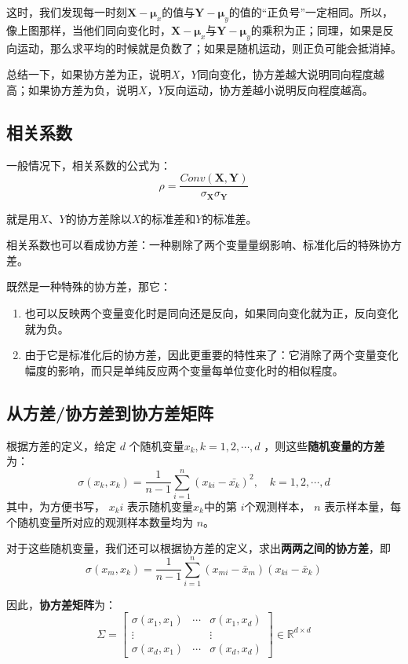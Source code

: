\documentclass[12pt]{article}
\begin{document}
这时，我们发现每一时刻$\mathbf{X} - \mathbf{\mu}_x$的值与$\mathbf{Y} - \mathbf{\mu}_y$的值的“正负号”一定相同。所以，像上图那样，当他们同向变化时，$\mathbf{X} - \mathbf{\mu}_x$与$\mathbf{Y} - \mathbf{\mu}_y$的乘积为正；同理，如果是反向运动，那么求平均的时候就是负数了；如果是随机运动，则正负可能会抵消掉。

总结一下，如果协方差为正，说明$X$，$Y$同向变化，协方差越大说明同向程度越高；如果协方差为负，说明$X$，$Y$反向运动，协方差越小说明反向程度越高。

\subsection{相关系数}
一般情况下，相关系数的公式为：
$$
\rho = \frac{Conv(\mathbf{X},\mathbf{Y})}{\sigma_{\mathbf{X}}\sigma_{\mathbf{Y}}}
$$

就是用$X$、$Y$的协方差除以$X$的标准差和$Y$的标准差。

相关系数也可以看成协方差：一种剔除了两个变量量纲影响、标准化后的特殊协方差。

既然是一种特殊的协方差，那它：
\begin{enumerate}
    \item 也可以反映两个变量变化时是同向还是反向，如果同向变化就为正，反向变化就为负。
    \item 由于它是标准化后的协方差，因此更重要的特性来了：它消除了两个变量变化幅度的影响，而只是单纯反应两个变量每单位变化时的相似程度。
\end{enumerate}

\subsection{从方差/协方差到协方差矩阵}
根据方差的定义，给定 $d$ 个随机变量$x_k, k = 1, 2, \cdots, d$ ，则这些\textbf{随机变量的方差}为：
$$
\sigma(x_k, x_k) = \frac{1}{n-1}\sum_{i=1}^n(x_{ki} - \bar{x_k})^2, \quad k = 1, 2, \cdots, d
$$
其中，为方便书写， $x_ki$ 表示随机变量$x_k$中的第 $i$个观测样本， $n$ 表示样本量，每个随机变量所对应的观测样本数量均为 $n$。

对于这些随机变量，我们还可以根据协方差的定义，求出\textbf{两两之间的协方差}，即
$$
\sigma(x_m, x_k) = \frac{1}{n-1}\sum_{i=1}^n(x_{mi} - \bar{x}_m)(x_{ki} - \bar{x}_k)
$$

因此，\textbf{协方差矩阵}为：
$$
\Sigma = 
\begin{bmatrix}
\sigma(x_1, x_1) & \cdots &\sigma(x_1, x_d) \\
\vdots & & \vdots \\
\sigma(x_d, x_1) & \cdots & \sigma(x_d, x_d)
\end{bmatrix}
\in \mathbb{R}^{d \times d}
$$
\end{document}
